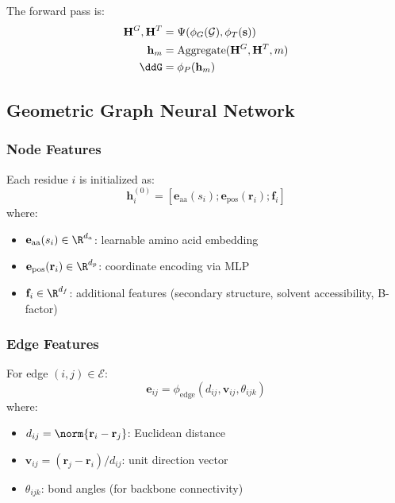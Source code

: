 \documentclass[12pt,en]{elegantpaper}
\begin{document}
The forward pass is:
\begin{align}
    \mathbf{H}^G, \mathbf{H}^T &= \Psi(\phi_G(\mathcal{G}), \phi_T(\mathbf{s})) \label{eq:diffusion} \\
    \mathbf{h}_m &= \text{Aggregate}(\mathbf{H}^G, \mathbf{H}^T, m) \\
    \ddG &= \phi_P(\mathbf{h}_m)
\end{align}

\subsection{Geometric Graph Neural Network}

\subsubsection{Node Features}

Each residue $i$ is initialized as:
\begin{equation}
    \mathbf{h}_i^{(0)} = [\mathbf{e}_{\text{aa}}(s_i); \mathbf{e}_{\text{pos}}(\mathbf{r}_i); \mathbf{f}_i]
\end{equation}
where:
\begin{itemize}
    \item $\mathbf{e}_{\text{aa}}(s_i) \in \R^{d_a}$: learnable amino acid embedding
    \item $\mathbf{e}_{\text{pos}}(\mathbf{r}_i) \in \R^{d_p}$: coordinate encoding via MLP
    \item $\mathbf{f}_i \in \R^{d_f}$: additional features (secondary structure, solvent accessibility, B-factor)
\end{itemize}

\subsubsection{Edge Features}

For edge $(i,j) \in \mathcal{E}$:
\begin{equation}
    \mathbf{e}_{ij} = \phi_{\text{edge}}(d_{ij}, \mathbf{v}_{ij}, \theta_{ijk})
\end{equation}
where:
\begin{itemize}
    \item $d_{ij} = \norm{\mathbf{r}_i - \mathbf{r}_j}$: Euclidean distance
    \item $\mathbf{v}_{ij} = (\mathbf{r}_j - \mathbf{r}_i)/d_{ij}$: unit direction vector
    \item $\theta_{ijk}$: bond angles (for backbone connectivity)
\end{itemize}
\end{document}
